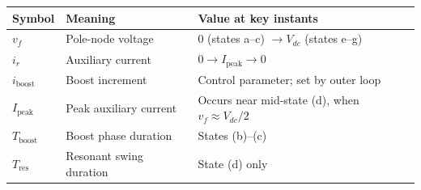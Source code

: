 \documentclass[12pt, a4paper]{article}
\newcommand{\Vdc}{V_{dc}}
\newcommand{\vf}{v_f}
\newcommand{\ir}{i_r}
\begin{document}
\begin{statebox}
\begin{tabular}{p{2.2cm} p{4.0cm} p{5.5cm}}
\toprule
Symbol & Meaning & Value at key instants \\
\midrule
$\vf$            & Pole-node voltage      & $0$ (states a--c) $\to \Vdc$ (states e--g) \\
$\ir$            & Auxiliary current      & $0 \to I_\text{peak} \to 0$ \\
$i_\text{boost}$ & Boost increment        & Control parameter; set by outer loop \\
$I_\text{peak}$  & Peak auxiliary current & Occurs near mid-state (d), when $\vf \approx \Vdc/2$ \\
$T_\text{boost}$ & Boost phase duration   & States (b)--(c) \\
$T_\text{res}$   & Resonant swing duration & State (d) only \\
\bottomrule
\end{tabular}
\end{statebox}
\end{document}
